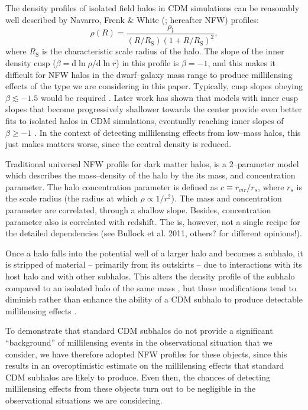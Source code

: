 \documentclass[paper=a4, fontsize=11pt]{scrartcl} %
\numberwithin{equation}{section} %
\numberwithin{figure}{section} %
\numberwithin{table}{section} %
\begin{document}
The density profiles of isolated field halos in CDM simulations can be reasonably well described by Navarro, Frenk \& White (\cite{NFW}; hereafter NFW) profiles:
\begin{equation}
\rho(R)=\frac{\rho_\mathrm{i}}{(R/R_\mathrm{S})(1+R/R_\mathrm{S})^{2}}, 
\label{NFW}
\end{equation}
where $R_\mathrm{S}$ is the characteristic scale radius of the halo. The slope of the inner density cusp ($\beta = \mathrm{d}\ln \rho /\mathrm{d}\ln r $) in this profile is $\beta = -1$, and this makes it difficult for NFW halos in the dwarf--galaxy mass range to produce millilensing effects of the type we are considering in this paper. Typically, cusp slopes obeying $\beta\lesssim -1.5$ would be required \cite{Zackrisson et al.}. Later work has shown that models with inner cusp slopes that become progressively shallower towards the center provide even better fits to isolated halos in CDM simulations, eventually reaching inner slopes of $\beta \geq -1$ \cite[e.g.][]{Navarro et al. 10}. In the context of detecting millilensing effects from low--mass halos, this just makes matters worse, since the central density is reduced.

Traditional universal NFW profile for dark matter halos, is a 2--parameter model which describes the mass--density of the halo by the its mass, and concentration parameter. The halo concentration parameter is defined as $c \equiv r_{vir}/r_s$, where $r_s$ is the scale radius (the radius at which $\rho \propto 1/r^2$). The mass and concentration parameter are correlated, through a shallow slope. Besides, concentration parameter also is correlated with redshift. The is, however, not a single recipe for the detailed dependencies (see Bullock et al. 2011, others? for different opinions!). 

Once a halo falls into the potential well of a larger halo and becomes a subhalo, it is stripped of material -- primarily from its outskirts -- due to interactions with its host halo and with other subhalos. This alters the density profile of the subhalo compared to an isolated halo of the same mass \cite[e.g.][]{Hayashi et al.,Kazantzidis et al.}, but these modifications tend to diminish rather than enhance the ability of a CDM subhalo to produce detectable millilensing effects \cite{Zackrisson et al.}. 

To demonstrate that standard CDM subhalos do not provide a significant ``background'' of millilensing events in the observational situation that we consider, we have therefore adopted NFW profiles for these objects, since this results in an overoptimistic estimate on the millilensing effects that standard CDM subhalos are likely to produce. Even then, the chances of detecting millilensing effects from these objects turn out to be negligible in the observational situations we are considering. 
\end{document}
